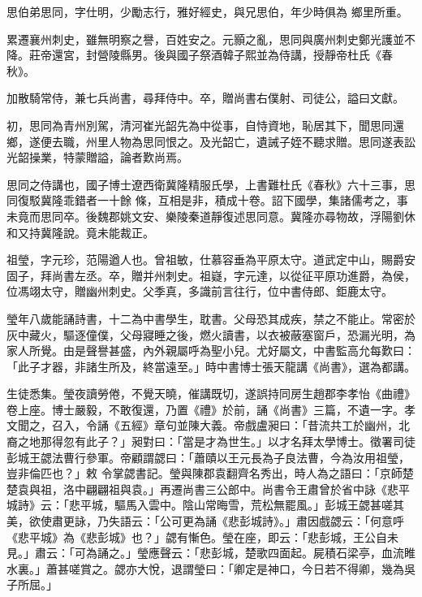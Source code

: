 \begin{pinyinscope}
 思伯弟思同，字仕明，少勵志行，雅好經史，與兄思伯，年少時俱為
 鄉里所重。



 累遷襄州刺史，雖無明察之譽，百姓安之。元顥之亂，思同與廣州刺史鄭光護並不降。莊帝還宮，封營陵縣男。後與國子祭酒韓子熙並為侍講，授靜帝杜氏《春秋》。



 加散騎常侍，兼七兵尚書，尋拜侍中。卒，贈尚書右僕射、司徒公，謚曰文獻。



 初，思同為青州別駕，清河崔光韶先為中從事，自恃資地，恥居其下，聞思同還鄉，遂便去職，州里人物為思同恨之。及光韶亡，遺誡子姪不聽求贈。思同遂表訟光韶操業，特蒙贈謚，論者歎尚焉。



 思同之侍講也，國子博士遼西衛冀隆精服氏學，上書難杜氏《春秋》六十三事，思同復駁冀隆乖錯者一十餘
 條，互相是非，積成十卷。詔下國學，集諸儒考之，事未竟而思同卒。後魏郡姚文安、樂陵秦道靜復述思同意。冀隆亦尋物故，浮陽劉休和又持冀隆說。竟未能裁正。



 祖瑩，字元珍，范陽遒人也。曾祖敏，仕慕容垂為平原太守。道武定中山，賜爵安固子，拜尚書左丞。卒，贈并州刺史。祖嶷，字元達，以從征平原功進爵，為侯，位馮翊太守，贈幽州刺史。父季真，多識前言往行，位中書侍郎、鉅鹿太守。



 瑩年八歲能誦詩書，十二為中書學生，耽書。父母恐其成疾，禁之不能止。常密於灰中藏火，驅逐僮僕，父母寢睡之後，燃火讀書，以衣被蔽塞窗戶，恐漏光明，為
 家人所覺。由是聲譽甚盛，內外親屬呼為聖小兒。尤好屬文，中書監高允每歎曰：「此子才器，非諸生所及，終當遠至。」時中書博士張天龍講《尚書》，選為都講。



 生徒悉集。瑩夜讀勞倦，不覺天曉，催講既切，遂誤持同房生趙郡李孝怡《曲禮》卷上座。博士嚴毅，不敢復還，乃置《禮》於前，誦《尚書》三篇，不遺一字。孝文聞之，召入，令誦《五經》章句並陳大義。帝戲盧昶曰：「昔流共工於幽州，北裔之地那得忽有此子？」昶對曰：「當是才為世生。」以才名拜太學博士。徵署司徒彭城王勰法曹行參軍。帝顧謂勰曰：「蕭賾以王元長為子良法曹，今為汝用祖瑩，豈非倫匹也？」敕
 令掌勰書記。瑩與陳郡袁翻齊名秀出，時人為之語曰：「京師楚楚袁與祖，洛中翩翩祖與袁。」再遷尚書三公郎中。尚書令王肅曾於省中詠《悲平城詩》云：「悲平城，驅馬入雲中。陰山常晦雪，荒松無罷風。」彭城王勰甚嗟其美，欲使肅更詠，乃失語云：「公可更為誦《悲彭城詩》。」肅因戲勰云：「何意呼《悲平城》為《悲彭城》也？」勰有慚色。瑩在座，即云：「悲彭城，王公自未見。」肅云：「可為誦之。」瑩應聲云：「悲彭城，楚歌四面起。屍積石梁亭，血流睢水裏。」蕭甚嗟賞之。勰亦大悅，退謂瑩曰：「卿定是神口，今日若不得卿，幾為吳子所屈。」




\end{pinyinscope}

